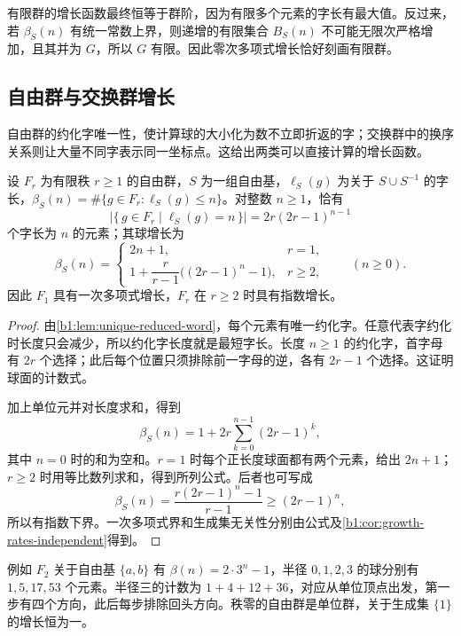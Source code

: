有限群的增长函数最终恒等于群阶，因为有限多个元素的字长有最大值。反过来，若 \(\beta_S(n)\) 有统一常数上界，则递增的有限集合 \(B_S(n)\) 不可能无限次严格增加，且其并为 \(G\)，所以 \(G\) 有限。因此零次多项式增长恰好刻画有限群。

\subsection{自由群与交换群增长}
\label{b1:subsec:C02:05}

自由群的约化字唯一性，使计算球的大小化为数不立即折返的字；交换群中的换序关系则让大量不同字表示同一坐标点。这给出两类可以直接计算的增长函数。

\begin{proposition}\label{b1:prop:free-group-growth}
	设 \(F_r\) 为有限秩 \(r\ge1\) 的自由群，\(S\) 为一组自由基，\(\ell_S(g)\) 为关于 \(S\cup S^{-1}\) 的字长，\(\beta_S(n)=\#\{g\in F_r:\ell_S(g)\le n\}\)。对整数 \(n\ge1\)，恰有
	\[
		\bigl|\{\,g\in F_r\mid\ell_S(g)=n\,\}\bigr|
		=2r(2r-1)^{n-1}
	\]
	个字长为 \(n\) 的元素；其球增长为
	\[
		\beta_S(n)=
		\begin{cases}
			2n+1,&r=1,\\[1ex]
			1+\dfrac{r}{r-1}\bigl((2r-1)^n-1\bigr),&r\ge2,
		\end{cases}
		\qquad(n\ge0).
	\]
	因此 \(F_1\) 具有一次多项式增长，\(F_r\) 在 \(r\ge2\) 时具有指数增长。
\end{proposition}
\begin{proof}
	由\cref{b1:lem:unique-reduced-word}，每个元素有唯一约化字。任意代表字约化时长度只会减少，所以约化字长度就是最短字长。长度 \(n\ge1\) 的约化字，首字母有 \(2r\) 个选择；此后每个位置只须排除前一字母的逆，各有 \(2r-1\) 个选择。这证明球面的计数式。

	加上单位元并对长度求和，得到
	\[
		\beta_S(n)=1+2r\sum_{k=0}^{n-1}(2r-1)^k,
	\]
	其中 \(n=0\) 时的和为空和。\(r=1\) 时每个正长度球面都有两个元素，给出 \(2n+1\)；\(r\ge2\) 时用等比数列求和，得到所列公式。后者也可写成
	\[
		\beta_S(n)=\dfrac{r(2r-1)^n-1}{r-1}\ge(2r-1)^n,
	\]
	所以有指数下界。一次多项式界和生成集无关性分别由公式及\cref{b1:cor:growth-rates-independent}得到。
\end{proof}

例如 \(F_2\) 关于自由基 \(\{a,b\}\) 有 \(\beta(n)=2\cdot3^n-1\)，半径 \(0,1,2,3\) 的球分别有 \(1,5,17,53\) 个元素。半径三的计数为 \(1+4+12+36\)，对应从单位顶点出发，第一步有四个方向，此后每步排除回头方向。秩零的自由群是单位群，关于生成集 \(\{1\}\) 的增长恒为一。

